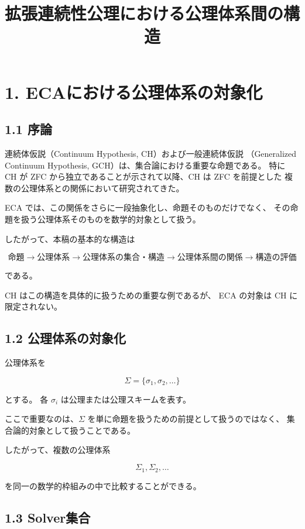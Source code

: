 \documentclass[11pt]{article}
\title{拡張連続性公理における公理体系間の構造}
\author{}
\date{}
\begin{document}
\maketitle

\section{1. ECAにおける公理体系の対象化}

\subsection{1.1 序論}

連続体仮説（Continuum Hypothesis, CH）および一般連続体仮説
（Generalized Continuum Hypothesis, GCH）は、集合論における重要な命題である。
特に CH が ZFC から独立であることが示されて以降、CH は ZFC を前提とした
複数の公理体系との関係において研究されてきた。

ECA では、この関係をさらに一段抽象化し、命題そのものだけでなく、
その命題を扱う公理体系そのものを数学的対象として扱う。

したがって、本稿の基本的な構造は

\[
\text{命題}
\longrightarrow
\text{公理体系}
\longrightarrow
\text{公理体系の集合・構造}
\longrightarrow
\text{公理体系間の関係}
\longrightarrow
\text{構造の評価}
\]

である。

CH はこの構造を具体的に扱うための重要な例であるが、
ECA の対象は CH に限定されない。

\subsection{1.2 公理体系の対象化}

公理体系を

\[
\Sigma=\{\sigma_1,\sigma_2,\ldots\}
\]

とする。
各 $\sigma_i$ は公理または公理スキームを表す。

ここで重要なのは、$\Sigma$ を単に命題を扱うための前提として扱うのではなく、
集合論的対象として扱うことである。

したがって、複数の公理体系

\[
\Sigma_1,\Sigma_2,\ldots
\]

を同一の数学的枠組みの中で比較することができる。

\subsection{1.3 Solver集合}
\end{document}
